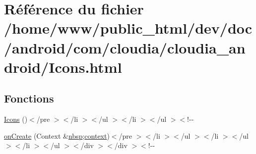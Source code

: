 \hypertarget{_icons_8html}{\section{Référence du fichier /home/www/public\-\_\-html/dev/doc/android/com/cloudia/cloudia\-\_\-android/\-Icons.html}
\label{_icons_8html}
}
\subsection*{Fonctions}
\begin{DoxyCompactItemize}
\item 
\hyperlink{_icons_8html_a119c38905c3a5147bc4e0bada7443dfb}{Icons} ()$<$/pre $>$$<$/li $>$$<$/ul $>$$<$/li $>$$<$/ul $>$$<$!-\/-\/
\item 
\hyperlink{_icons_8html_a4720a33643e3fb68096968b38655fc22}{on\-Create} (Context \&\hyperlink{_tools_8html_aef915316f784c9063d942974538301a6}{nbsp};\hyperlink{_stations_list_adapter_8html_a261f9f58ccbeaa962c4e675e4212c9cc}{context})$<$/pre $>$$<$/li $>$$<$/ul $>$$<$/li $>$$<$/ul $>$$<$/li $>$$<$/ul $>$$<$/div $>$$<$/div $>$$<$!-\/-\/
\end{DoxyCompactItemize}

